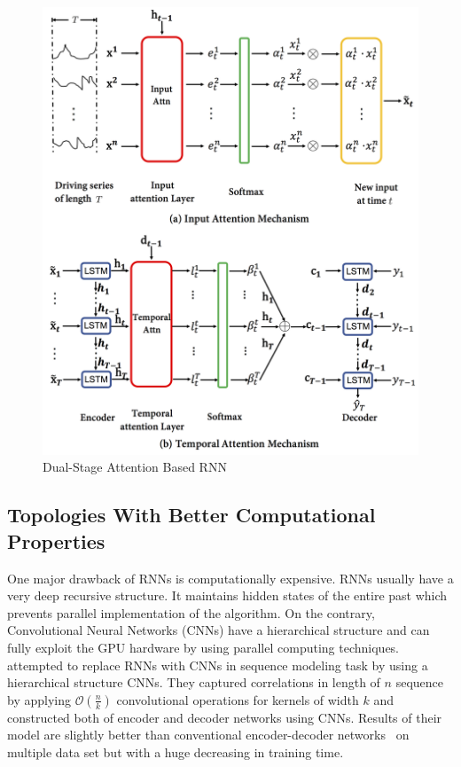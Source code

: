\documentclass{article} \usepackage{tabularx}
\renewcommand{\citename}{\citet} \renewcommand{\cite}{\citep}
\begin{document}
\begin{figure}[H]
  \centering
  \includegraphics[scale=0.3]{images/darnn.png}
  \caption{Dual-Stage Attention Based RNN}
  \label{fig:darnn}
\end{figure}

\subsection{Topologies With Better Computational Properties}
\label{sec:better_comp}

One major drawback of RNNs is computationally expensive. RNNs
usually have a very deep recursive structure. It maintains hidden
states of the entire past which prevents parallel implementation
of the algorithm. On the contrary, Convolutional Neural Networks
(CNNs) have a hierarchical structure and can fully exploit the
GPU hardware by using parallel computing techniques.
\citename{gehring2017convolutional} attempted to replace RNNs
with CNNs in sequence modeling task by using a hierarchical
structure CNNs. They captured correlations in length of $n$
sequence by applying $\mathcal{O}(\frac{n}{k})$ convolutional
operations for kernels of width $k$ and constructed both of
encoder and decoder networks using CNNs. Results of their model
are slightly better than conventional encoder-decoder
networks~\cite{attention} on multiple data set but with a huge
decreasing in training time.
\end{document}
